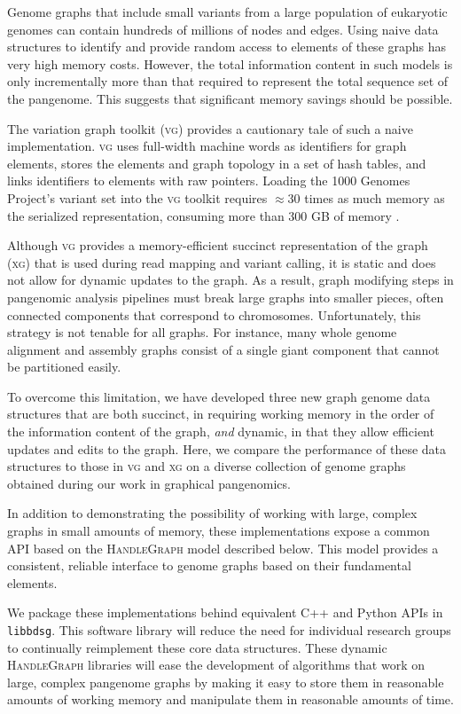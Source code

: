 \documentclass{article}
\begin{document}
Genome graphs that include small variants from a large population of eukaryotic genomes can contain hundreds of millions of nodes and edges.
Using naive data structures to identify and provide random access to elements of these graphs has very high memory costs.
However, the total information content in such models is only incrementally more than that required to represent the total sequence set of the pangenome.
This suggests that significant memory savings should be possible.

The variation graph toolkit (\textsc{vg}) \cite{Garrison_2018} provides a cautionary tale of such a naive implementation.
\textsc{vg} uses full-width machine words as identifiers for graph elements, stores the elements and graph topology in a set of hash tables, and links identifiers to elements with raw pointers.
Loading the 1000 Genomes Project's variant set into the \textsc{vg} toolkit requires $\approx$30 times as much memory as the serialized representation, consuming more than 300 GB of memory \cite{Garrison_2019}.

Although \textsc{vg} provides a memory-efficient succinct representation of the graph (\textsc{xg}) that is used during read mapping and variant calling, it is static and does not allow for dynamic updates to the graph.
As a result, graph modifying steps in pangenomic analysis pipelines must break large graphs into smaller pieces, often connected components that correspond to chromosomes.
Unfortunately, this strategy is not tenable for all graphs.
For instance, many whole genome alignment and assembly graphs consist of a single giant component that cannot be partitioned easily.

To overcome this limitation, we have developed three new graph genome data structures that are both succinct, in requiring working memory in the order of the information content of the graph, \emph{and} dynamic, in that they allow efficient updates and edits to the graph.
Here, we compare the performance of these data structures to those in \textsc{vg} and \textsc{xg} on a diverse collection of genome graphs obtained during our work in graphical pangenomics.

In addition to demonstrating the possibility of working with large, complex graphs in small amounts of memory, these implementations expose a common API based on the \textsc{HandleGraph} model described below.
This model provides a consistent, reliable interface to genome graphs based on their fundamental elements.

We package these implementations behind equivalent C++ and Python APIs in \texttt{libbdsg}.
This software library will reduce the need for individual research groups to continually reimplement these core data structures.
These dynamic \textsc{HandleGraph} libraries will ease the development of algorithms that work on large, complex pangenome graphs by making it easy to store them in reasonable amounts of working memory and manipulate them in reasonable amounts of time.
\end{document}
